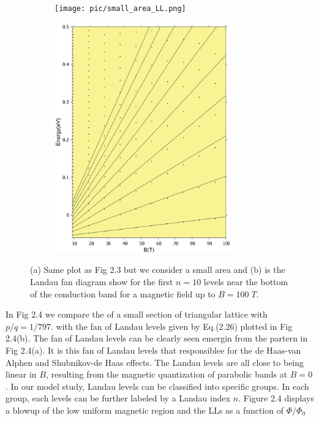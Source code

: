 \documentclass{report}
\begin{document}
\begin{figure}[htb]
	\centering
	\begin{subfigure}[b]{0.49\textwidth}
		\centering
		{\caption{}\label{fig:3 landau level 1}}
		{\texttt{[image: pic/small\_area\_LL.png]}}
	\end{subfigure}
	\begin{subfigure}[b]{0.49\textwidth}
		\centering
		\caption{}\label{fig:1 landau level 2}
		\includegraphics[width=0.85\textwidth,height=1.2\linewidth]{pic/landaulevel_h0_q_797.pdf}
	\end{subfigure}
	\caption{
		(a) Same plot as Fig 2.3 but we consider a small area and (b) is the Landau fan diagram show for the first $n = 10$ levels near the bottom of the conduction band for a magnetic field up to $B = 100\; T$.
	}
\end{figure}

In Fig 2.4 we compare the  of a small section of triangular lattice with $p / q = 1 / 797$. with the fan of Landau levels given by Eq.(2.26) plotted in Fig 2.4(b). The fan of Landau levels can be clearly seen emergin from the partern in Fig 2.4(a). It is this fan of Landau levels that responsiblee for the de Haas-van Alphen and Shubnikov-de Haas effects. \cite{Shoenberg_1984,singleton2001band,blundell2001magnetism,kittel1987quantum} The Landau levels are all close to being linear in $B$, resulting from the magnetic quantization of parabolic bands at $B = 0$. In our model study, Landau levels can be classified into specific groups. In each group, each levels can be further labeled by a Landau index $n$. Figure 2.4 displays a blowup of the low uniform magnetic region and the LLs as a function of $\Phi / \Phi_{0}$ \cite{Li_2011}
\end{document}
